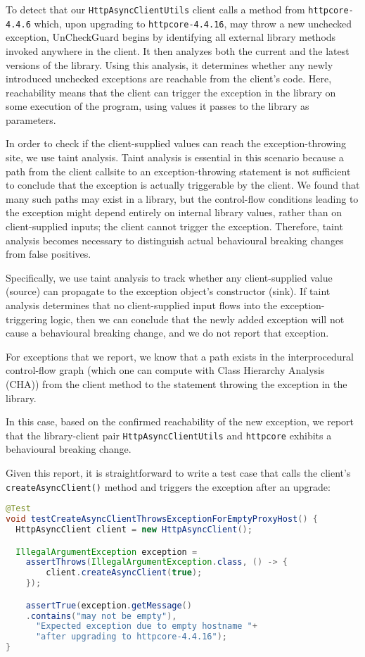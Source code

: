 To detect that our \texttt{HttpAsyncClientUtils} client calls a method from \texttt{httpcore-4.4.6} which, upon upgrading to \texttt{httpcore-4.4.16}, may throw a new unchecked exception, UnCheckGuard begins by identifying all external library methods invoked anywhere in the client. It then analyzes both the current and the latest versions of the library. Using this analysis, it determines whether any newly introduced unchecked exceptions are reachable from the client's code. Here, reachability means that the client can trigger the exception in the library on some execution of the program, using values it passes to the library as parameters.

In order to check if the client-supplied values can reach the exception-throwing site, we use taint analysis. Taint analysis is essential in this scenario because a path from the client callsite to an exception-throwing statement is not sufficient to conclude that the exception is actually triggerable by the client. We found that many such paths may exist in a library, but the control-flow conditions leading to the exception might depend entirely on internal library values, rather than on client-supplied inputs; the client cannot trigger the exception. Therefore, taint analysis becomes necessary to distinguish actual behavioural breaking changes from false positives.

Specifically, we use taint analysis to track whether any client-supplied value (source) can propagate to the exception object's constructor (sink). If taint analysis determines that no client-supplied input flows into the exception-triggering logic, then we can conclude that the newly added exception will not cause a behavioural breaking change, and we do not report that exception.

For exceptions that we report, we know that a path exists in the interprocedural control-flow graph (which one can compute with Class Hierarchy Analysis (CHA)) from the client method to the statement throwing the exception in the library.

In this case, based on the confirmed reachability of the new exception, we report that the library-client pair \texttt{HttpAsyncClientUtils} and \texttt{httpcore} exhibits a behavioural breaking change.

Given this report, it is straightforward to write a test case that calls the client's \texttt{createAsyncClient()} method
and triggers the exception after an upgrade:
\begin{lstlisting}[language=Java,basicstyle=\scriptsize\ttfamily]
@Test
void testCreateAsyncClientThrowsExceptionForEmptyProxyHost() {
  HttpAsyncClient client = new HttpAsyncClient();

  IllegalArgumentException exception =
    assertThrows(IllegalArgumentException.class, () -> {
        client.createAsyncClient(true);
    });

    assertTrue(exception.getMessage()
    .contains("may not be empty"),
      "Expected exception due to empty hostname "+
      "after upgrading to httpcore-4.4.16");
}
\end{lstlisting}
